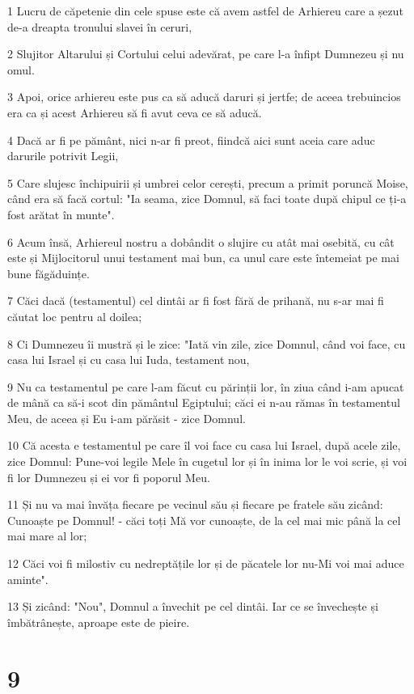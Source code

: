 \par 1 Lucru de căpetenie din cele spuse este că avem astfel de Arhiereu care a șezut de-a dreapta tronului slavei în ceruri,
\par 2 Slujitor Altarului și Cortului celui adevărat, pe care l-a înfipt Dumnezeu și nu omul.
\par 3 Apoi, orice arhiereu este pus ca să aducă daruri și jertfe; de aceea trebuincios era ca și acest Arhiereu să fi avut ceva ce să aducă.
\par 4 Dacă ar fi pe pământ, nici n-ar fi preot, fiindcă aici sunt aceia care aduc darurile potrivit Legii,
\par 5 Care slujesc închipuirii și umbrei celor cerești, precum a primit poruncă Moise, când era să facă cortul: "Ia seama, zice Domnul, să faci toate după chipul ce ți-a fost arătat în munte".
\par 6 Acum însă, Arhiereul nostru a dobândit o slujire cu atât mai osebită, cu cât este și Mijlocitorul unui testament mai bun, ca unul care este întemeiat pe mai bune făgăduințe.
\par 7 Căci dacă (testamentul) cel dintâi ar fi fost fără de prihană, nu s-ar mai fi căutat loc pentru al doilea;
\par 8 Ci Dumnezeu îi mustră și le zice: "Iată vin zile, zice Domnul, când voi face, cu casa lui Israel și cu casa lui Iuda, testament nou,
\par 9 Nu ca testamentul pe care l-am făcut cu părinții lor, în ziua când i-am apucat de mână ca să-i scot din pământul Egiptului; căci ei n-au rămas în testamentul Meu, de aceea și Eu i-am părăsit - zice Domnul.
\par 10 Că acesta e testamentul pe care îl voi face cu casa lui Israel, după acele zile, zice Domnul: Pune-voi legile Mele în cugetul lor și în inima lor le voi scrie, și voi fi lor Dumnezeu și ei vor fi poporul Meu.
\par 11 Și nu va mai învăța fiecare pe vecinul său și fiecare pe fratele său zicând: Cunoaște pe Domnul! - căci toți Mă vor cunoaște, de la cel mai mic până la cel mai mare al lor;
\par 12 Căci voi fi milostiv cu nedreptățile lor și de păcatele lor nu-Mi voi mai aduce aminte".
\par 13 Și zicând: "Nou", Domnul a învechit pe cel dintâi. Iar ce se învechește și îmbătrânește, aproape este de pieire.

\chapter{9}


